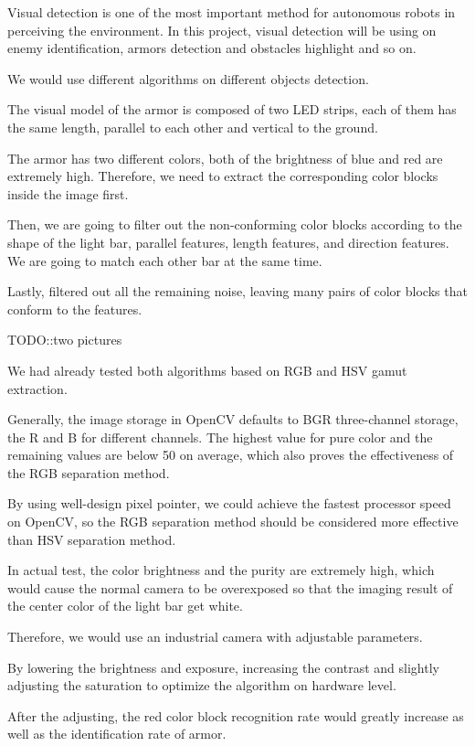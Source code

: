 Visual detection is one of the most important method for autonomous robots in perceiving the environment.
In this project, visual detection will be using on enemy identification, armors detection and obstacles highlight and so on.

We would use different algorithms on different objects detection.

The visual model of the armor is composed of two LED strips, each of them has the same length, parallel to each other and vertical to the ground.

The armor has two different colors, both of the brightness of blue and red are extremely high. Therefore, we need to extract the corresponding color blocks inside the image first.

Then, we are going to filter out the non-conforming color blocks according to the shape of the light bar, parallel features, length features, and direction features. We are going to match each other bar at the same time.

Lastly, filtered out all the remaining noise, leaving many pairs of color blocks that conform to the features.

TODO::two pictures

We had already tested both algorithms based on RGB and HSV gamut extraction.

Generally, the image storage in OpenCV defaults to BGR three-channel storage, the R and B for different channels.
The highest value for pure color and the remaining values are below 50 on average, which also proves the effectiveness of the RGB separation method.

By using well-design pixel pointer, we could achieve the fastest processor speed on OpenCV, so the RGB separation method should be considered more effective than HSV separation method. 

In actual test, the color brightness and the purity are extremely high, which would cause the normal camera to be overexposed so that the imaging result of the center color of the light bar get white.

Therefore, we would use an industrial camera with adjustable parameters.

By lowering the brightness and exposure, increasing the contrast and slightly adjusting the saturation to optimize the algorithm on hardware level. 

After the adjusting, the red color block recognition rate would greatly increase as well as the identification rate of armor.

